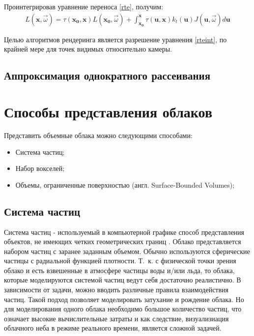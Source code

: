 Проинтегрировав уравнение переноса \ref{rte}, получим:
\begin{equation}
	\label{rteint}
	\begin{aligned}
		L(\mathbf{x}, \vec{\omega}) = \tau(\mathbf{x_0}, \mathbf{x}) L(\mathbf{x_0}, \vec{\omega}) + \int_{\mathbf{x_0}}^{\mathbf{x}} \tau(\mathbf{u}, \mathbf{x}) k_t(\mathbf{u}) J(\mathbf{u}, \vec{\omega}) d\mathbf{u}
	\end{aligned}
\end{equation}

Целью алгоритмов рендеринга является разрешение уравнения \ref{rteint}, по крайней мере для точек видимых относительно камеры. 

\subsection{Аппроксимация однократного рассеивания}


 




\section{Способы представления облаков}

Представить объемные облака можно следующими способами:
\begin{itemize}
	\item Система частиц;
	\item Набор вокселей;
	\item Объемы, ограниченные поверхностью (англ. Surface-Bounded Volumes);
\end{itemize}

\subsection{Система частиц}
\label{particles}
Система частиц - используемый в компьютерной графике способ представления объектов, не имеющих четких геометрических границ \cite{particles1}. 
Облако представляется набором частиц с заранее заданным объемом. Обычно используются сферические частицы с радиальной функцией плотности. Т.~к. с физической точки зрения облако и есть взвешенные в атмосфере частицы воды и/или льда, то 
облака, которые моделируются системой частиц ведут себя достаточно реалистично. В зависимости от задачи, можно вводить различные правила взаимодействия частиц.
Такой подход позволяет моделировать затухание и рождение облака. Но для моделирования одного облака необходимо большое количество частиц, что означает высокие вычислительные затраты и как следствие, визуализиация облачного неба в режиме реального времени, является сложной задачей.  

